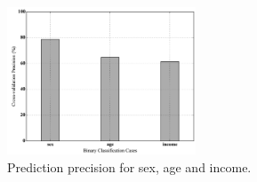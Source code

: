 \begin{figure}[htbp]
	\centering
	\includegraphics[width=0.5\textwidth]{figures/amphiro.pdf}
	\caption{Prediction precision for sex, age and income.}
	\label{fig:amphiro_precision}
\end{figure}



%
%

 





